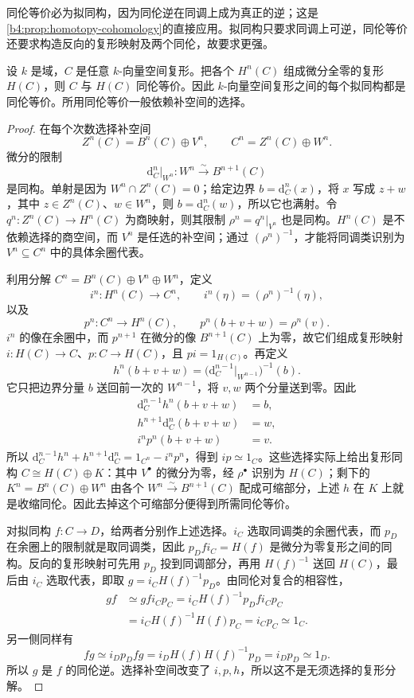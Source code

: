 同伦等价必为拟同构，因为同伦逆在同调上成为真正的逆；这是\cref{b4:prop:homotopy-cohomology}的直接应用。拟同构只要求同调上可逆，同伦等价还要求构造反向的复形映射及两个同伦，故要求更强。

\begin{proposition}\label{b4:prop:field-complex-splitting}
	设 \(k\) 是域，\(C\) 是任意 \(k\)-向量空间复形。把各个 \(H^n(C)\) 组成微分全零的复形 \(H(C)\)，则 \(C\) 与 \(H(C)\) 同伦等价。因此 \(k\)-向量空间复形之间的每个拟同构都是同伦等价。所用同伦等价一般依赖补空间的选择。
\end{proposition}
\begin{proof}
	在每个次数选择补空间
	\[
		Z^n(C)=B^n(C)\oplus V^n,\qquad C^n=Z^n(C)\oplus W^n.
	\]
	微分的限制
	\[
		\mathrm{d}_C^n|_{W^n}:W^n\xrightarrow{\sim}B^{n+1}(C)
	\]
	是同构。单射是因为 \(W^n\cap Z^n(C)=0\)；给定边界 \(b=\mathrm{d}_C^n(x)\)，将 \(x\) 写成 \(z+w\)，其中 \(z\in Z^n(C)\)、\(w\in W^n\)，则 \(b=\mathrm{d}_C^n(w)\)，所以它也满射。令 \(q^n:Z^n(C)\to H^n(C)\) 为商映射，则其限制 \(\rho^n=q^n|_{V^n}\) 也是同构。\(H^n(C)\) 是不依赖选择的商空间，而 \(V^n\) 是任选的补空间；通过 \((\rho^n)^{-1}\)，才能将同调类识别为 \(V^n\subseteq C^n\) 中的具体余圈代表。

	利用分解 \(C^n=B^n(C)\oplus V^n\oplus W^n\)，定义
	\[
		i^n:H^n(C)\longrightarrow C^n,\qquad i^n(\eta)=(\rho^n)^{-1}(\eta),
	\]
	以及
	\[
		p^n:C^n\longrightarrow H^n(C),\qquad p^n(b+v+w)=\rho^n(v).
	\]
	\(i^n\) 的像在余圈中，而 \(p^{n+1}\) 在微分的像 \(B^{n+1}(C)\) 上为零，故它们组成复形映射 \(i:H(C)\to C\)、\(p:C\to H(C)\)，且 \(pi=1_{H(C)}\)。再定义
	\[
		h^n(b+v+w) =\bigl(\mathrm{d}_C^{n-1}|_{W^{n-1}}\bigr)^{-1}(b).
	\]
	它只把边界分量 \(b\) 送回前一次的 \(W^{n-1}\)，将 \(v,w\) 两个分量送到零。因此
	\[
		\begin{aligned}
			\mathrm{d}_C^{n-1}h^n(b+v+w)&=b,\\
			h^{n+1}\mathrm{d}_C^n(b+v+w)&=w,\\
			i^np^n(b+v+w)&=v.
		\end{aligned}
	\]
	所以 \(\mathrm{d}_C^{n-1}h^n+h^{n+1}\mathrm{d}_C^n=1_{C^n}-i^np^n\)，得到 \(ip\simeq1_C\)。这些选择实际上给出复形同构 \(C\cong H(C)\oplus K\)：其中 \(V^\bullet\) 的微分为零，经 \(\rho^\bullet\) 识别为 \(H(C)\)；剩下的 \(K^n=B^n(C)\oplus W^n\) 由各个 \(W^n\xrightarrow{\sim}B^{n+1}(C)\) 配成可缩部分，上述 \(h\) 在 \(K\) 上就是收缩同伦。因此去掉这个可缩部分便得到所需同伦等价。

	对拟同构 \(f:C\to D\)，给两者分别作上述选择。\(i_C\) 选取同调类的余圈代表，而 \(p_D\) 在余圈上的限制就是取同调类，因此 \(p_Dfi_C=H(f)\) 是微分为零复形之间的同构。反向的复形映射可先用 \(p_D\) 投到同调部分，再用 \(H(f)^{-1}\) 送回 \(H(C)\)，最后由 \(i_C\) 选取代表，即取 \(g=i_C H(f)^{-1}p_D\)。由同伦对复合的相容性，
	\[
		\begin{aligned}
			gf&\simeq gf i_Cp_C =i_C H(f)^{-1}p_Dfi_Cp_C\\
			&=i_C H(f)^{-1}H(f)p_C =i_Cp_C\simeq1_C.
		\end{aligned}
	\]
	另一侧同样有
	\[
		fg\simeq i_Dp_Dfg =i_D H(f)H(f)^{-1}p_D =i_Dp_D\simeq1_D.
	\]
	所以 \(g\) 是 \(f\) 的同伦逆。选择补空间改变了 \(i,p,h\)，所以这不是无须选择的复形分解。
\end{proof}

